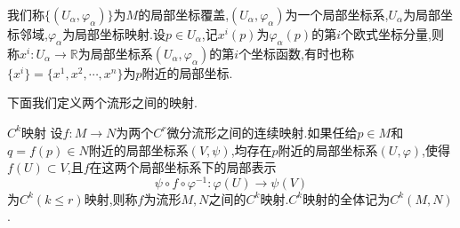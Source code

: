 \begin{center}
\end{center}
我们称$\{(U_{\alpha},\varphi_{\alpha})\}$为$M$的局部坐标覆盖,$(U_{\alpha},\varphi_{\alpha})$为一个局部坐标系,$U_{\alpha}$为局部坐标邻域,$\varphi_{\alpha}$为局部坐标映射.设$p\in U_{\alpha}$,记$x^i(p)$为$\varphi_{\alpha}(p)$的第$i$个欧式坐标分量,则称$x^i:U_{\alpha}\to \mathbb{R}$为局部坐标系$(U_{\alpha},\varphi_{\alpha})$的第$i$个坐标函数,有时也称$\{x^i\}=\{x^1,x^2,\cdots,x^n\}$为$p$附近的局部坐标.\par
下面我们定义两个流形之间的映射.
\begin{Definition}{$C^{k}$映射}
    设$f:M\to N$为两个$C^r$微分流形之间的连续映射.如果任给$p\in M$和$q=f(p)\in N$附近的局部坐标系$(V,\psi )$,均存在$p$附近的局部坐标系$(U,\varphi)$,使得$f(U)\subset V$,且$f$在这两个局部坐标系下的局部表示
    $$
    \psi\circ f\circ \varphi^{-1}:\varphi(U)\to \psi(V)
    $$
    为$C^{k}(k\leqslant r)$映射,则称$f$为流形$M,N$之间的$C^{k}$映射.$C^{k}$映射的全体记为$C^{k}(M,N)$.
\end{Definition}
